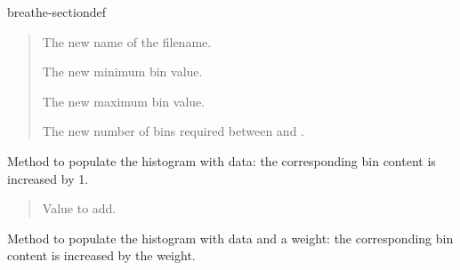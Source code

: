 \documentclass[letterpaper,10pt,english]{sphinxmanual}
\begin{document}
\begin{fulllineitems}
\begin{sphinxuseclass}{breathe-sectiondef}
\begin{fulllineitems}
\sphinxAtStartPar
\begin{quote}\begin{description}
\sphinxAtStartPar
The new name of the filename. 

\sphinxAtStartPar
The new minimum bin value. 

\sphinxAtStartPar
The new maximum bin value. 

\sphinxAtStartPar
The new number of bins required between  and . 

\end{description}\end{quote}


\end{fulllineitems}


\begin{fulllineitems}
\label{\detokenize{Simulation/SimulationCodeDoc:_CPPv4N4Hist4FillEd}}
\pysigstartsignatures
\pysigstartmultiline
{}
\pysigstopmultiline
\pysigstopsignatures
\sphinxAtStartPar
Method to populate the histogram with data: the corresponding bin content is increased by 1. 

\sphinxAtStartPar
\begin{quote}\begin{description}
\sphinxAtStartPar
Value to add. 

\end{description}\end{quote}


\end{fulllineitems}


\begin{fulllineitems}
\label{\detokenize{Simulation/SimulationCodeDoc:_CPPv4N4Hist4FillEdd}}
\pysigstartsignatures
\pysigstartmultiline
{}
\pysigstopmultiline
\pysigstopsignatures
\sphinxAtStartPar
Method to populate the histogram with data and a weight: the corresponding bin content is increased by the weight. 


\end{fulllineitems}
\end{sphinxuseclass}
\end{fulllineitems}
\end{document}
